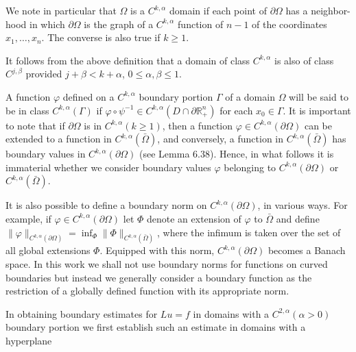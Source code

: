 \medskip

\noindent \hspace*{2em}We note in particular that $\Omega$ is a $C^{k,\alpha}$ domain if each point of $\partial\Omega$ has a neighbor-
hood in which $\partial\Omega$ is the graph of a $C^{k,\alpha}$ function of $n-1$ of the coordinates
$x_1,\ldots,x_n$. The converse is also true if $k\ge 1$.

\noindent \hspace*{2em}It follows from the above definition that a domain of class $C^{k,\alpha}$ is also of class
$C^{j,\beta}$ provided $j+\beta<k+\alpha$, $0\le \alpha,\beta \le 1$.

\noindent \hspace*{2em}A function $\varphi$ defined on a $C^{k,\alpha}$ boundary portion $\Gamma$ of a domain $\Omega$ will be said
to be in class $C^{k,\alpha}(\Gamma)$ if $\varphi \circ \psi^{-1}\in C^{k,\alpha}(D\cap \partial\mathbb{R}^n_{+})$ for each $x_0 \in \Gamma$. It is important to
note that if $\partial\Omega$ is in $C^{k,\alpha}(k\ge 1)$, then a function $\varphi \in C^{k,\alpha}(\partial\Omega)$ can be extended to
a function in $C^{k,\alpha}(\bar{\Omega})$, and conversely, a function in $C^{k,\alpha}(\bar{\Omega})$ has boundary values in
$C^{k,\alpha}(\partial\Omega)$ (see Lemma 6.38). Hence, in what follows it is immaterial whether we
consider boundary values $\varphi$ belonging to $C^{k,\alpha}(\partial\Omega)$ or $C^{k,\alpha}(\bar{\Omega})$.

\noindent \hspace*{2em}It is also possible to define a boundary norm on $C^{k,\alpha}(\partial\Omega)$, in various ways. For
example, if $\varphi \in C^{k,\alpha}(\partial\Omega)$ let $\Phi$ denote an extension of $\varphi$ to $\bar{\Omega}$ and define
$\|\varphi\|_{C^{k,\alpha}(\partial\Omega)}=\inf_{\Phi}\|\Phi\|_{C^{k,\alpha}(\bar{\Omega})}$, where the infimum is taken over the set of all global extensions $\Phi$.
Equipped with this norm, $C^{k,\alpha}(\partial\Omega)$ becomes a Banach space. In this work we shall
not use boundary norms for functions on curved boundaries but instead we
generally consider a boundary function as the restriction of a globally defined
function with its appropriate norm.

\noindent \hspace*{2em}In obtaining boundary estimates for $Lu=f$ in domains with a $C^{2,\alpha}(\alpha>0)$
boundary portion we first establish such an estimate in domains with a hyperplane


